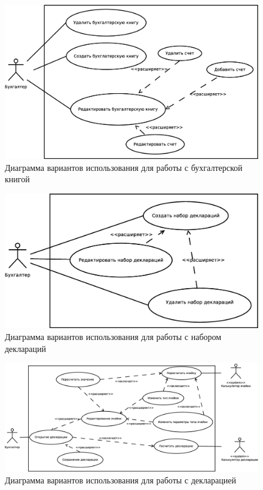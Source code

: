 \documentclass[14pt,a4paper]{reportmod}
\begin{document}
\begin{figure}
  \centering
  \includegraphics[scale=0.4]{uml/usecase_3}
  \caption{Диаграмма вариантов использования для работы с бухгалтерской книгой}
  \label{pic:use_case_3}
\end{figure}

\begin{figure}
  \centering
  \includegraphics[scale=0.4]{uml/usecase_2}
  \caption{Диаграмма вариантов использования для работы с набором деклараций}
  \label{pic:use_case_2}
\end{figure}

\begin{figure}
  \centering
  \includegraphics[scale=0.4]{uml/usecase_1}
  \caption{Диаграмма вариантов использования для работы с декларацией}
  \label{pic:use_case_1}
\end{figure}
\end{document}
